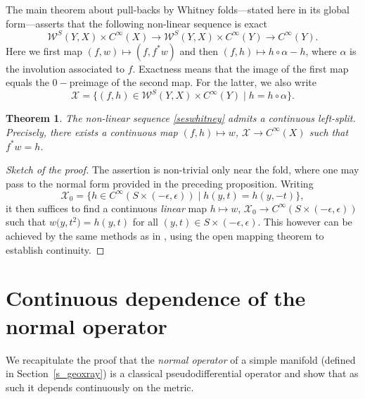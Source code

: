 \documentclass[10pt,a4paper]{amsart}
\numberwithin{equation}{section}
\newtheorem{Theorem}{Theorem}[section]
\theoremstyle{definition}
\newcommand{\1}{{\bf 1}}
\begin{document}
The main theorem about pull-backs by Whitney folds---stated here in its global form---asserts that the following non-linear sequence is exact
\begin{equation}\label{seswhitney}
	\mathcal W^S(Y,X)\times C^\infty(X)\to \mathcal W^S(Y,X)\times C^\infty(Y)\to C^\infty(Y).
\end{equation}
Here we first map $(f,w) \mapsto (f,f^*w)$ and then $(f,h)\mapsto h\circ \alpha- h$, where $\alpha$ is the involution associated to $f$. Exactness means that the image of the first map equals the $0-$preimage of the second map. For the latter, we also write
\[
	\mathcal X = \big\{(f,h)\in \mathcal W^S(Y,X)\times C^\infty(Y)\mid h = h\circ \alpha\big\}.
\]


\begin{Theorem}\label{thm_seswhitney} The non-linear sequence \eqref{seswhitney} admits a continuous left-split. Precisely, there exists a continuous map
$(f,h)\mapsto w$, $ \mathcal X \to C^\infty(X)$
such that $f^*w = h$.
\end{Theorem}

\begin{proof}[Sketch of the proof]
	The assertion is non-trivial only near the fold, where one may pass to the normal form provided in the preceding proposition. Writing
	\[
		\mathcal X_0 = \{h\in C^\infty\left(S\times (-\epsilon,\epsilon)\right)\mid h(y,t) = h(y,-t) \},
	\]
	it then suffices to find a continuous {\it linear} map $h\mapsto w $, $ \mathcal X_0 \to C^\infty(S\times (-\epsilon,\epsilon))$
	such that $w\bigl(y,t^2\bigr)=h(y,t)$ for all $(y,t)\in S\times (-\epsilon,\epsilon)$. This however can be achieved by the same methods as in \cite[Theorem C.4.4]{Hor07}, using the open mapping theorem to establish continuity.
\end{proof}


\section{Continuous dependence of the normal operator} \label{s_appb}

We recapitulate the proof that the {\it normal operator} of a simple manifold (defined in Section~\ref{s_geoxray}) is a classical pseudodifferential operator and show that as such it depends continuously on the metric.
\end{document}
